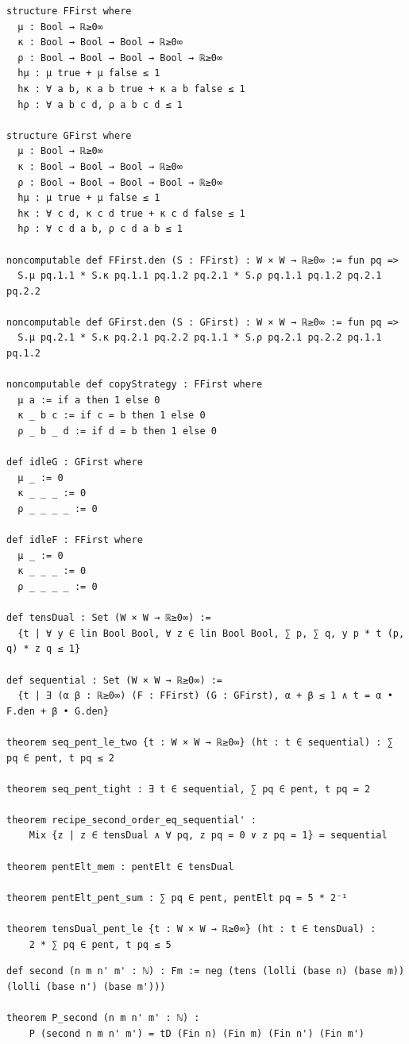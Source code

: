 \begin{lstlisting}
structure FFirst where
  μ : Bool → ℝ≥0∞
  κ : Bool → Bool → Bool → ℝ≥0∞
  ρ : Bool → Bool → Bool → Bool → ℝ≥0∞
  hμ : μ true + μ false ≤ 1
  hκ : ∀ a b, κ a b true + κ a b false ≤ 1
  hρ : ∀ a b c d, ρ a b c d ≤ 1

structure GFirst where
  μ : Bool → ℝ≥0∞
  κ : Bool → Bool → Bool → ℝ≥0∞
  ρ : Bool → Bool → Bool → Bool → ℝ≥0∞
  hμ : μ true + μ false ≤ 1
  hκ : ∀ c d, κ c d true + κ c d false ≤ 1
  hρ : ∀ c d a b, ρ c d a b ≤ 1

noncomputable def FFirst.den (S : FFirst) : W × W → ℝ≥0∞ := fun pq =>
  S.μ pq.1.1 * S.κ pq.1.1 pq.1.2 pq.2.1 * S.ρ pq.1.1 pq.1.2 pq.2.1 pq.2.2

noncomputable def GFirst.den (S : GFirst) : W × W → ℝ≥0∞ := fun pq =>
  S.μ pq.2.1 * S.κ pq.2.1 pq.2.2 pq.1.1 * S.ρ pq.2.1 pq.2.2 pq.1.1 pq.1.2

noncomputable def copyStrategy : FFirst where
  μ a := if a then 1 else 0
  κ _ b c := if c = b then 1 else 0
  ρ _ b _ d := if d = b then 1 else 0

def idleG : GFirst where
  μ _ := 0
  κ _ _ _ := 0
  ρ _ _ _ _ := 0

def idleF : FFirst where
  μ _ := 0
  κ _ _ _ := 0
  ρ _ _ _ _ := 0

def tensDual : Set (W × W → ℝ≥0∞) :=
  {t | ∀ y ∈ lin Bool Bool, ∀ z ∈ lin Bool Bool, ∑ p, ∑ q, y p * t (p, q) * z q ≤ 1}

def sequential : Set (W × W → ℝ≥0∞) :=
  {t | ∃ (α β : ℝ≥0∞) (F : FFirst) (G : GFirst), α + β ≤ 1 ∧ t = α • F.den + β • G.den}

theorem seq_pent_le_two {t : W × W → ℝ≥0∞} (ht : t ∈ sequential) : ∑ pq ∈ pent, t pq ≤ 2

theorem seq_pent_tight : ∃ t ∈ sequential, ∑ pq ∈ pent, t pq = 2

theorem recipe_second_order_eq_sequential' :
    Mix {z | z ∈ tensDual ∧ ∀ pq, z pq = 0 ∨ z pq = 1} = sequential

theorem pentElt_mem : pentElt ∈ tensDual

theorem pentElt_pent_sum : ∑ pq ∈ pent, pentElt pq = 5 * 2⁻¹

theorem tensDual_pent_le {t : W × W → ℝ≥0∞} (ht : t ∈ tensDual) :
    2 * ∑ pq ∈ pent, t pq ≤ 5
\end{lstlisting}

\begin{lstlisting}
def second (n m n' m' : ℕ) : Fm := neg (tens (lolli (base n) (base m)) (lolli (base n') (base m')))

theorem P_second (n m n' m' : ℕ) :
    P (second n m n' m') = tD (Fin n) (Fin m) (Fin n') (Fin m')
\end{lstlisting}

